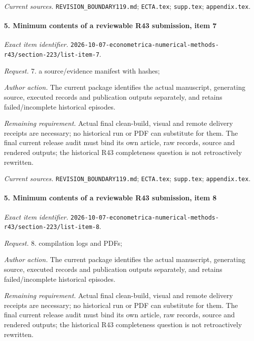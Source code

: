 \par\emph{Current sources.} \nolinkurl{REVISION_BOUNDARY119.md}; \nolinkurl{ECTA.tex}; \nolinkurl{supp.tex}; \nolinkurl{appendix.tex}.

\paragraph{5. Minimum contents of a reviewable R43 submission, item 7}

\emph{Exact item identifier.} \nolinkurl{2026-10-07-econometrica-numerical-methods-r43/section-223/list-item-7}.

\par\emph{Request.} 7. a source/\allowbreak{}evidence manifest with hashes;

\par\emph{Author action.} The current package identifies the actual manuscript, generating source, executed records and publication outputs separately, and retains failed/\allowbreak{}incomplete historical episodes.

\par\emph{Remaining requirement.} Actual final clean-build, visual and remote delivery receipts are necessary; no historical run or PDF can substitute for them. The final current release audit must bind its own article, raw records, source and rendered outputs; the historical R43 completeness question is not retroactively rewritten.

\par\emph{Current sources.} \nolinkurl{REVISION_BOUNDARY119.md}; \nolinkurl{ECTA.tex}; \nolinkurl{supp.tex}; \nolinkurl{appendix.tex}.

\paragraph{5. Minimum contents of a reviewable R43 submission, item 8}

\emph{Exact item identifier.} \nolinkurl{2026-10-07-econometrica-numerical-methods-r43/section-223/list-item-8}.

\par\emph{Request.} 8. compilation logs and PDFs;

\par\emph{Author action.} The current package identifies the actual manuscript, generating source, executed records and publication outputs separately, and retains failed/\allowbreak{}incomplete historical episodes.

\par\emph{Remaining requirement.} Actual final clean-build, visual and remote delivery receipts are necessary; no historical run or PDF can substitute for them. The final current release audit must bind its own article, raw records, source and rendered outputs; the historical R43 completeness question is not retroactively rewritten.

